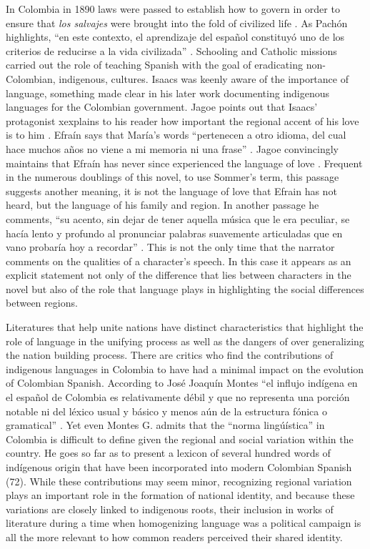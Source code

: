 In Colombia in 1890 laws were passed to establish how to govern in order to ensure that \textit{los salvajes} were brought into the fold of civilized life \autocite[158]{Montes1997}. 
As Pachón highlights, \enquote{en este contexto, el aprendizaje del español constituyó uno de los criterios de reducirse a la vida civilizada} \autocite[158]{Montes1997}. 
Schooling and Catholic missions carried out the role of teaching Spanish with the goal of eradicating non-Colombian, indigenous, cultures. 
Isaacs was keenly aware of the importance of language, something made clear in his later work documenting indigenous languages for the Colombian government.
Jagoe points out that Isaacs' protagonist xexplains to his reader how important the regional accent of his love is to him \autocite[153]{Jagoe2003}.
Efraín says that María’s words \enquote{pertenecen a otro idioma, del cual hace muchos años no viene a mi memoria ni una frase} \autocite[78]{Isaacs2012}.
Jagoe convincingly maintains that Efraín has never since experienced the language of love \autocite[153]{Jagoe2003}.
Frequent in the numerous doublings of this novel, to use Sommer's term, this passage suggests another meaning, it is not the language of love that Efrain has not heard, but the language of his family and region.
In another passage he comments, \enquote{su acento, sin dejar de tener aquella música que le era peculiar, se hacía lento y profundo al pronunciar palabras suavemente articuladas que en vano probaría hoy a recordar} \autocite[78]{Isaacs2012}.
This is not the only time that the narrator comments on the qualities of a character's speech.
In this case it appears as an explicit statement not only of the difference that lies between characters in the novel but also of the role that language plays in highlighting the social differences between regions.

Literatures that help unite nations have distinct characteristics that highlight the role of language in the unifying process as well as the dangers of over generalizing the nation building process. 
There are critics who find the contributions of indigenous languages in Colombia to have had a minimal impact on the evolution of Colombian Spanish. 
According to José Joaquín Montes \enquote{el influjo indígena en el español de Colombia es relativamente débil y que no representa una porción notable ni del léxico usual y básico y menos aún de la estructura fónica o gramatical} \autocite[72]{Montes1997}. 
Yet even Montes G. admits that the \enquote{norma lingúística} in Colombia is difficult to define given the regional and social variation within the country. 
He goes so far as to present a lexicon of several hundred words of indígenous origin that have been incorporated into modern Colombian Spanish (72). 
While these contributions may seem minor, recognizing regional variation plays an important role in the formation of national identity, and because these variations are closely linked to indigenous roots, their inclusion in works of literature during a time when homogenizing language was a political campaign is all the more relevant to how common readers perceived their shared identity. 


